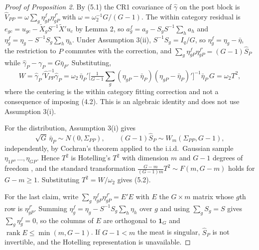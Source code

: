 \documentclass[12pt]{article}
\theoremstyle{definition}
\numberwithin{equation}{section}
\begin{document}
\begin{proof}[Proof of Proposition 2]
By (5.1) the CR1 covariance of $\hat{\gamma}$ on the post block is
$\hat{V}_{PP} = \omega \sum_g \eta^f_{gP}\eta^{f\prime}_{gP}$ with $\omega =
\omega_2^{-1}G/(G-1)$. The within category residual is $e_{gc} = u_{gc} -
\tilde{X}_g S^{-1}\tilde{X}'u_c$ by Lemma 2, so $a^f_g = a_g -
S_gS^{-1}\sum_h a_h$ and $\eta^f_g = \eta_g - S^{-1}S_g\sum_h \eta_h$. Under
Assumption 3(ii), $S^{-1}S_g = I_q/G$, so $\eta^f_g = \eta_g -
\bar{\eta}$, the restriction to $P$ commutes with the correction, and
$\sum_g \eta^f_{gP}\eta^{f\prime}_{gP} = (G-1)\hat{S}_P$ while
$\hat{\gamma}_P - \gamma_P = G\bar{\eta}_P$. Substituting,
$$
W = \hat{\gamma}_P' \hat{V}_{PP}^{-1} \hat{\gamma}_P
  = \omega_2\, \bar{\eta}_P' \Big[\tfrac{1}{G-1}\textstyle\sum_g
    (\eta_{gP}-\bar{\eta}_P)(\eta_{gP}-\bar{\eta}_P)'\Big]^{-1}
    \bar{\eta}_P \, G
  = \omega_2 T^2 ,
$$
where the centering is the within category fitting correction and not a
consequence of imposing (4.2). This is an algebraic identity and does
not use Assumption 3(i).

For the distribution, Assumption 3(i) gives
\[
\sqrt{G}\,\bar{\eta}_P \sim N(0,\Sigma_{PP}),
\qquad
(G-1)\hat{S}_P \sim W_m(\Sigma_{PP}, G-1),
\]
independently, by Cochran's theorem applied to the i.i.d.\ Gaussian sample
$\eta_{1P},\dots,\eta_{GP}$. Hence $T^2$ is Hotelling's $T^2$ with dimension $m$
and $G-1$ degrees of freedom \citep{hotelling1931}, and the standard
transformation $\frac{G-m}{(G-1)m}T^2 \sim F(m,G-m)$ holds for $G-m\ge1$.
Substituting $T^2 = W/\omega_2$ gives (5.2).

For the last claim, write $\sum_g \eta^f_{gP}\eta^{f\prime}_{gP} = E'E$ with $E$
the $G \times m$ matrix whose $g$th row is $\eta^{f\prime}_{gP}$. Summing
$\eta^f_g = \eta_g - S^{-1}S_g\sum_h\eta_h$ over $g$ and using $\sum_g S_g = S$
gives $\sum_g \eta^f_g = 0$, so the columns of $E$ are orthogonal to
$\mathbf{1}_G$ and $\operatorname{rank}E \le \min(m, G-1)$. If $G - 1 < m$ the
meat is singular, $\hat{S}_P$ is not invertible, and the Hotelling
representation is unavailable.
\end{proof}
\end{document}
